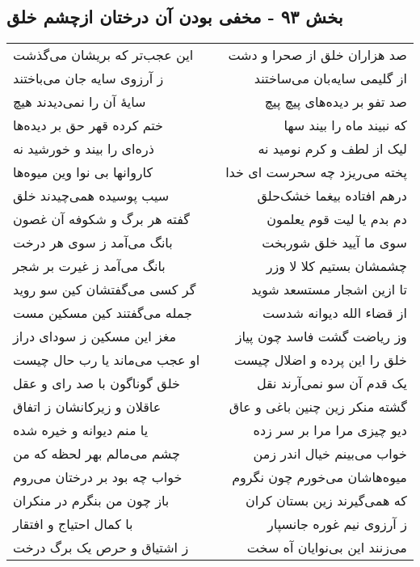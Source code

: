 \begin{center}
\section*{بخش ۹۳ - مخفی بودن آن درختان ازچشم خلق}
\label{sec:sh093}
\begin{longtable}{l p{0.5cm} r}
این عجب‌تر که بریشان می‌گذشت
&&
صد هزاران خلق از صحرا و دشت
\\
ز آرزوی سایه جان می‌باختند
&&
از گلیمی سایه‌بان می‌ساختند
\\
سایهٔ آن را نمی‌دیدند هیچ
&&
صد تفو بر دیده‌های پیچ پیچ
\\
ختم کرده قهر حق بر دیده‌ها
&&
که نبیند ماه را بیند سها
\\
ذره‌ای را بیند و خورشید نه
&&
لیک از لطف و کرم نومید نه
\\
کاروانها بی نوا وین میوه‌ها
&&
پخته می‌ریزد چه سحرست ای خدا
\\
سیب پوسیده همی‌چیدند خلق
&&
درهم افتاده بیغما خشک‌حلق
\\
گفته هر برگ و شکوفه آن غصون
&&
دم بدم یا لیت قوم یعلمون
\\
بانگ می‌آمد ز سوی هر درخت
&&
سوی ما آیید خلق شوربخت
\\
بانگ می‌آمد ز غیرت بر شجر
&&
چشمشان بستیم کلا لا وزر
\\
گر کسی می‌گفتشان کین سو روید
&&
تا ازین اشجار مستسعد شوید
\\
جمله می‌گفتند کین مسکین مست
&&
از قضاء الله دیوانه شدست
\\
مغز این مسکین ز سودای دراز
&&
وز ریاضت گشت فاسد چون پیاز
\\
او عجب می‌ماند یا رب حال چیست
&&
خلق را این پرده و اضلال چیست
\\
خلق گوناگون با صد رای و عقل
&&
یک قدم آن سو نمی‌آرند نقل
\\
عاقلان و زیرکانشان ز اتفاق
&&
گشته منکر زین چنین باغی و عاق
\\
یا منم دیوانه و خیره شده
&&
دیو چیزی مرا مرا بر سر زده
\\
چشم می‌مالم بهر لحظه که من
&&
خواب می‌بینم خیال اندر زمن
\\
خواب چه بود بر درختان می‌روم
&&
میوه‌هاشان می‌خورم چون نگروم
\\
باز چون من بنگرم در منکران
&&
که همی‌گیرند زین بستان کران
\\
با کمال احتیاج و افتقار
&&
ز آرزوی نیم غوره جانسپار
\\
ز اشتیاق و حرص یک برگ درخت
&&
می‌زنند این بی‌نوایان آه سخت
\\

\end{longtable}
\end{center}
